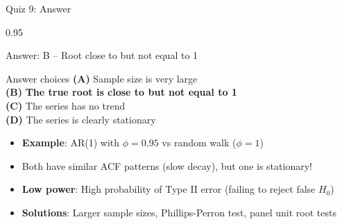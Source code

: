 \documentclass[9pt, aspectratio=169, t]{beamer}
\begin{document}
\begin{frame}{Quiz 9: Answer}
    \begin{cminipage}{0.95\textwidth}
    {\small
    \begin{exampleblock}{Answer: B -- Root close to but not equal to 1}

        \vspace{0.1cm}

    \begin{block}{Answer choices}
        \textcolor{MainBlue}{\textbf{(A)}} Sample size is very large \incorrect\\[3pt]
        \textcolor{MainBlue}{\textbf{(B)}} \textbf{\textcolor{Forest}{The true root is close to but not equal to 1}} \correct\\[3pt]
        \textcolor{MainBlue}{\textbf{(C)}} The series has no trend \incorrect\\[3pt]
        \textcolor{MainBlue}{\textbf{(D)}} The series is clearly stationary \incorrect
    \end{block}

        \vspace{0.2cm}

        \begin{itemize}
            \item \textbf{Example}: AR(1) with $\phi = 0.95$ vs random walk ($\phi = 1$)
            \item Both have similar ACF patterns (slow decay), but one is stationary!
            \item \textbf{Low power}: High probability of Type II error (failing to reject false $H_0$)
            \item \textbf{Solutions}: Larger sample sizes, Phillips-Perron test, panel unit root tests
        \end{itemize}
    \end{exampleblock}
    }

    \end{cminipage}
\end{frame}
\end{document}
